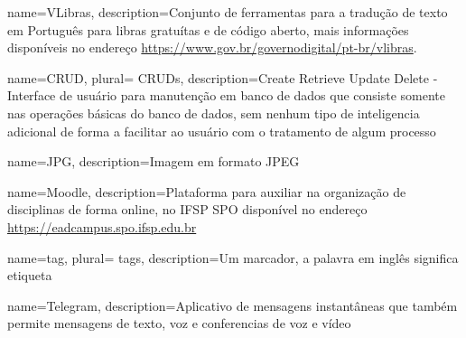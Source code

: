  {
	name=VLibras,
	description={Conjunto de ferramentas para a tradução de texto em Português para \ac{libras} gratuítas e de código aberto, mais informações disponíveis no endereço \url{https://www.gov.br/governodigital/pt-br/vlibras}.}
}


 



 {
    name=CRUD,
    plural= {CRUDs},
    description={Create Retrieve Update Delete - Interface de usuário para manutenção em banco de dados que consiste somente nas operações básicas do banco de dados, sem nenhum tipo de inteligencia adicional de forma a facilitar ao usuário com o tratamento de algum processo}
}

 {
    name=JPG,
    description={Imagem em formato JPEG}
}

 {
    name=Moodle,
    description={Plataforma para auxiliar na organização de disciplinas de forma online, no IFSP SPO disponível no endereço \url{https://eadcampus.spo.ifsp.edu.br}}
}


 {
    name=tag,
    plural= {tags},
    description={Um marcador, a palavra em inglês significa etiqueta}
}
                
 {
    name=Telegram,
    description={Aplicativo de mensagens instantâneas que também permite mensagens de texto, voz e conferencias de voz e vídeo}
}
